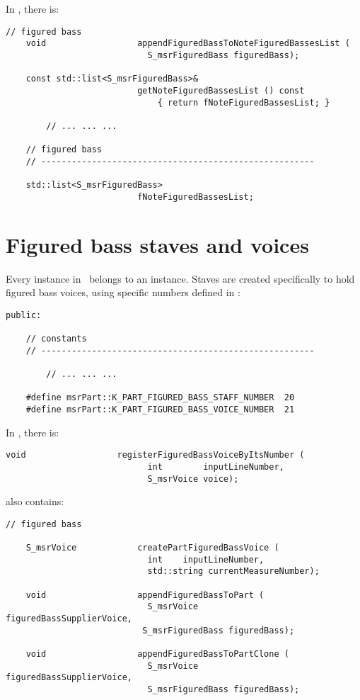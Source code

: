 In , there is:
\begin{lstlisting}[language=CPlusPlus]
    // figured bass
    void                  appendFiguredBassToNoteFiguredBassesList (
                            S_msrFiguredBass figuredBass);

    const std::list<S_msrFiguredBass>&
                          getNoteFiguredBassesList () const
                              { return fNoteFiguredBassesList; }

		// ... ... ...

    // figured bass
    // ------------------------------------------------------

    std::list<S_msrFiguredBass>
                          fNoteFiguredBassesList;
\end{lstlisting}


\section{Figured bass staves and voices}

Every  instance in \mf\ belongs to an  instance. Staves are created specifically to hold figured bass voices, using specific numbers defined in :
\begin{lstlisting}[language=CPlusPlus]
  public:

    // constants
    // ------------------------------------------------------

		// ... ... ...

    #define msrPart::K_PART_FIGURED_BASS_STAFF_NUMBER  20
    #define msrPart::K_PART_FIGURED_BASS_VOICE_NUMBER  21
\end{lstlisting}

In , there is:
\begin{lstlisting}[language=CPlusPlus]
     void                  registerFiguredBassVoiceByItsNumber (
                            int        inputLineNumber,
                            S_msrVoice voice);
\end{lstlisting}

 also contains:
\begin{lstlisting}[language=CPlusPlus]
    // figured bass

    S_msrVoice            createPartFiguredBassVoice (
                            int    inputLineNumber,
                            std::string currentMeasureNumber);

    void                  appendFiguredBassToPart (
                            S_msrVoice             figuredBassSupplierVoice,
                           S_msrFiguredBass figuredBass);

    void                  appendFiguredBassToPartClone (
                            S_msrVoice              figuredBassSupplierVoice,
                            S_msrFiguredBass figuredBass);
\end{lstlisting}

